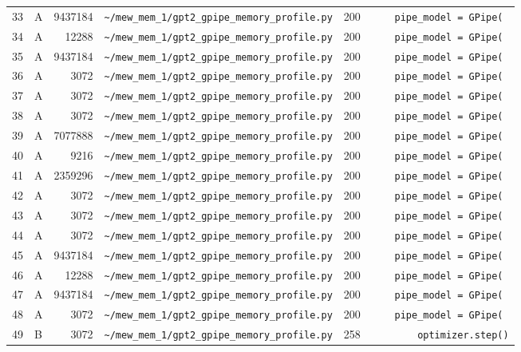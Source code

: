 \documentclass{article}
\begin{document}
\begin{longtable}{r l r p{6.5cm} r p{7.0cm}}
33 & A & 9437184 & \lstinline|~/mew_mem_1/gpt2_gpipe_memory_profile.py| & 200 & \lstinline|    pipe_model = GPipe(| \\
34 & A & 12288 & \lstinline|~/mew_mem_1/gpt2_gpipe_memory_profile.py| & 200 & \lstinline|    pipe_model = GPipe(| \\
35 & A & 9437184 & \lstinline|~/mew_mem_1/gpt2_gpipe_memory_profile.py| & 200 & \lstinline|    pipe_model = GPipe(| \\
36 & A & 3072 & \lstinline|~/mew_mem_1/gpt2_gpipe_memory_profile.py| & 200 & \lstinline|    pipe_model = GPipe(| \\
37 & A & 3072 & \lstinline|~/mew_mem_1/gpt2_gpipe_memory_profile.py| & 200 & \lstinline|    pipe_model = GPipe(| \\
38 & A & 3072 & \lstinline|~/mew_mem_1/gpt2_gpipe_memory_profile.py| & 200 & \lstinline|    pipe_model = GPipe(| \\
39 & A & 7077888 & \lstinline|~/mew_mem_1/gpt2_gpipe_memory_profile.py| & 200 & \lstinline|    pipe_model = GPipe(| \\
40 & A & 9216 & \lstinline|~/mew_mem_1/gpt2_gpipe_memory_profile.py| & 200 & \lstinline|    pipe_model = GPipe(| \\
41 & A & 2359296 & \lstinline|~/mew_mem_1/gpt2_gpipe_memory_profile.py| & 200 & \lstinline|    pipe_model = GPipe(| \\
42 & A & 3072 & \lstinline|~/mew_mem_1/gpt2_gpipe_memory_profile.py| & 200 & \lstinline|    pipe_model = GPipe(| \\
43 & A & 3072 & \lstinline|~/mew_mem_1/gpt2_gpipe_memory_profile.py| & 200 & \lstinline|    pipe_model = GPipe(| \\
44 & A & 3072 & \lstinline|~/mew_mem_1/gpt2_gpipe_memory_profile.py| & 200 & \lstinline|    pipe_model = GPipe(| \\
45 & A & 9437184 & \lstinline|~/mew_mem_1/gpt2_gpipe_memory_profile.py| & 200 & \lstinline|    pipe_model = GPipe(| \\
46 & A & 12288 & \lstinline|~/mew_mem_1/gpt2_gpipe_memory_profile.py| & 200 & \lstinline|    pipe_model = GPipe(| \\
47 & A & 9437184 & \lstinline|~/mew_mem_1/gpt2_gpipe_memory_profile.py| & 200 & \lstinline|    pipe_model = GPipe(| \\
48 & A & 3072 & \lstinline|~/mew_mem_1/gpt2_gpipe_memory_profile.py| & 200 & \lstinline|    pipe_model = GPipe(| \\
49 & B & 3072 & \lstinline|~/mew_mem_1/gpt2_gpipe_memory_profile.py| & 258 & \lstinline|        optimizer.step()| \\

\end{longtable}
\end{document}
